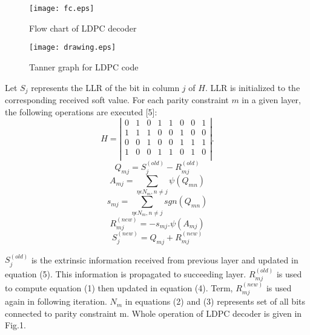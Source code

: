 \documentclass[3p,times,procedia]{elsarticle}
\begin{document}
  \begin{figure}[!ht]
    \begin{minipage}{0.49\linewidth}
\texttt{[image: fc.eps]}
\vspace{-0.4cm}
\caption{Flow chart of LDPC decoder}
    \end{minipage}
\hspace{1.5cm}
    \begin{minipage}{0.49\linewidth}
\texttt{[image: drawing.eps]}
\caption{Tanner graph for LDPC code}
    \end{minipage}
  \end{figure}




Let $S_j$ represents the LLR of the bit in column $j$ of $H$. LLR is initialized to the corresponding received soft value.
For each parity constraint $m$ in a given layer, the following operations are executed [5]:
\[ H = \left| \begin{array}{cccccccc}
0  & 1 & 0 & 1 & 1 & 0 & 0 & 1 \\
1  & 1 & 1 & 0 & 0 & 1 & 0 & 0 \\
0  & 0 & 1 & 0 & 0 & 1 & 1 & 1 \\
1  & 0 & 0 & 1 & 1 & 0 & 1 & 0 \\
\end{array} \right|.\]
\begin{equation}
Q_{mj}=S_j^{(old)}-R_{mj}^{(old)}
\end{equation}
\begin{equation}
A_{mj}=\sum_{\eta\epsilon N_m,n\neq j}\psi (Q_{mn})
\end{equation}
\begin{equation}
s_{mj}=\sum_{\eta\epsilon N_m,n\neq j}sgn (Q_{mn})
\end{equation}
\begin{equation}
R_{mj}^{(new)}=-s_{mj}.\psi (A_{mj})
\end{equation}
\begin{equation}
S_j^{(new)}=Q_{mj}+R_{mj}^{(new)}
\end{equation}



$S_j^{(old)}$ is the extrinsic information received from previous layer and updated in equation (5). This information is propagated to succeeding layer. $R_{mj}^{(old)}$ is used to compute equation (1) then updated in equation (4). Term, $R_{mj}^{(new)}$ is used again in following iteration. $N_m$ in equations  (2) and (3) represents set of all bits connected to parity constraint m. Whole operation of LDPC decoder is given in Fig.1.
\end{document}
